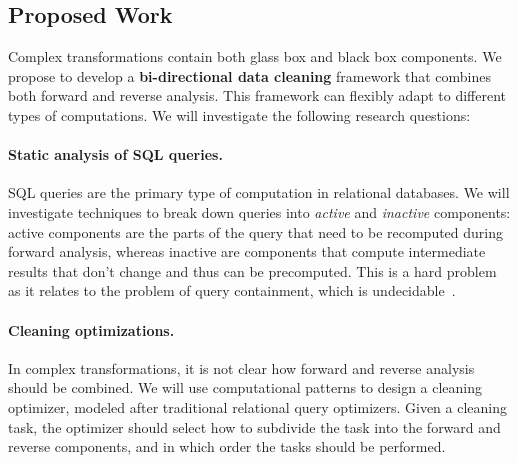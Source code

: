 




\subsection{Proposed Work} %
\label{sub:research_plan}

Complex transformations contain both glass box and black box
components. We propose to develop a \textbf{bi-directional data
  cleaning} framework that combines both forward and reverse
analysis. This framework can flexibly adapt to different types of
computations. We will investigate the following research questions:

\paragraph{Static analysis of SQL queries.} %
\label{par:static_analysis_of_sql_queries}
SQL queries are the primary type of computation in relational databases. We will investigate techniques to break down queries into \emph{active} and \emph{inactive} components: active components are the parts of the query that need to be recomputed during forward analysis, whereas inactive are components that compute intermediate results that don't change and thus can be precomputed. This is a hard problem as it relates to the problem of query containment, which is undecidable~\cite{DBLP:conf/pods/CalvaneseGL98}.

\paragraph{Cleaning optimizations.} %
\label{par:cleaning_optimizations}
In complex transformations, it is not clear how forward and reverse analysis
should be combined. We will use computational patterns to design a cleaning
optimizer, modeled after traditional relational query optimizers. Given a
cleaning task, the optimizer should select how to subdivide the task into the
forward and reverse components, and in which order the tasks should be
performed.

